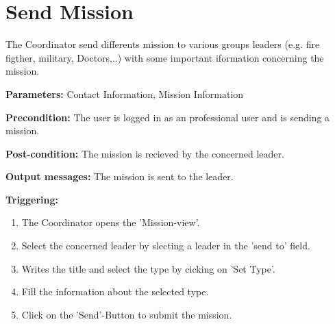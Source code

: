 \section{Send Mission}
\label{operation:SendMission}
The Coordinator send differents mission to various groups leaders (e.g. fire
figther, military, Doctors,..) with some important iformation concerning the mission.\\
\begin{description}
\item \textbf{Parameters:} Contact Information, Mission Information
\item \textbf{Precondition:} The user is logged in as an professional user
and is sending a mission.
\item \textbf{Post-condition:} The mission is recieved by the concerned leader.
\item \textbf{Output messages:} The mission is sent to the leader.
\item \textbf{Triggering:}
\begin{enumerate}
\item The Coordinator opens the 'Mission-view'.
\item Select the concerned leader by slecting a leader in the 'send to' field.
\item Writes the title and select the type by cicking on 'Set Type'.
\item Fill the information about the selected type.
\item Click on the 'Send'-Button to submit the mission.
\end{enumerate}
\end{description} 

